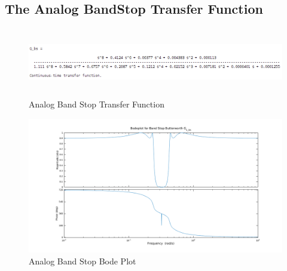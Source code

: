 \documentclass[22pt]{article}
\begin{document}
\subsection{The Analog BandStop Transfer Function}
\begin{figure}[H]
  \centering
  \includegraphics[width=1.2\textwidth,height=3cm]{images/Analog_cheb_bs_tf}
  \caption{Analog Band Stop Transfer Function}
  \label{fig:11}
\end{figure}
\begin{figure}[H]
  \centering
  \includegraphics[scale=0.5]{images/Bodeplot_cheb_bs}
  \caption{Analog Band Stop Bode Plot}
  \label{fig:12}  
\end{figure}
\end{document}
